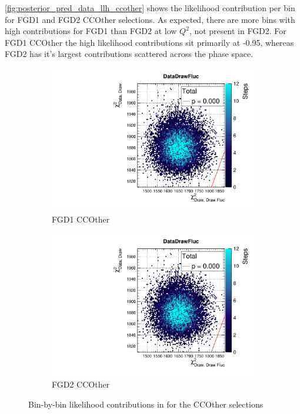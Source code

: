 \autoref{fig:posterior_pred_data_llh_ccother} shows the likelihood contribution per bin for FGD1 and FGD2 CCOther selections. As expected, there are more bins with high contributions for FGD1 than FGD2 at low $Q^2$, not present in FGD2. For FGD1 CCOther the high likelihood contributions sit primarily at -0.95, whereas FGD2 has it's largest contributions scattered across the phase space.
\begin{figure}[h]
	\begin{subfigure}[t]{0.49\textwidth}
		\includegraphics[width=\textwidth, trim={0mm 6mm 0mm 11mm}, clip,page=21]{figures/mach3/data/postpred/2017b_NewData_NewDet_UpdXsecStep_2Xsec_4Det_5Flux_0_PostPred_procs}
		\caption{FGD1 CCOther}
	\end{subfigure}
	\begin{subfigure}[t]{0.49\textwidth}
		\includegraphics[width=\textwidth, trim={0mm 6mm 0mm 11mm}, clip,page=48]{figures/mach3/data/postpred/2017b_NewData_NewDet_UpdXsecStep_2Xsec_4Det_5Flux_0_PostPred_procs}
		\caption{FGD2 CCOther}
	\end{subfigure}
\caption{Bin-by-bin likelihood contributions in \pmu \cosmu for the CCOther selections}
\label{fig:posterior_pred_data_llh_ccother}
\end{figure}


